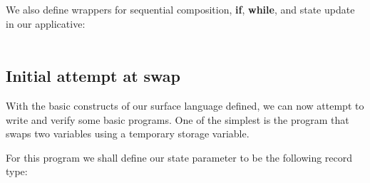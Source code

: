 \documentclass[sigplan]{acmart}%
\begin{document}
We also define wrappers for sequential composition, \textbf{if}, \textbf{while}, and state update in our  applicative:
\\[-0.5em]

\noindent {}\AgdaSpace{}%
\AgdaSpace{}%
\AgdaSpace{}%
\AgdaSymbol{=}\AgdaSpace{}%
\AgdaSpace{}%
\AgdaSpace{}%
\AgdaSpace{}%
\AgdaSpace{}%
\\[-0.5em]

\noindent {}\AgdaSpace{}%
\AgdaSpace{}%
\AgdaSpace{}%
\AgdaSpace{}%
\AgdaSpace{}%
\AgdaSpace{}%
\AgdaSpace{}%
\AgdaSymbol{=}\AgdaSpace{}%
\AgdaSpace{}%
\AgdaSymbol{(}\AgdaSpace{}%
\AgdaSymbol{)}\AgdaSpace{}%
\AgdaSpace{}%
\AgdaSpace{}%
%
\begin{code}
\>[2]\AgdaSpace{}%
\AgdaSpace{}%
\AgdaSpace{}%
\AgdaSpace{}%
\AgdaSpace{}%
\AgdaSymbol{=}\AgdaSpace{}%
\AgdaSpace{}%
\AgdaSymbol{(}\AgdaSpace{}%
\AgdaSymbol{)}\AgdaSpace{}%
\AgdaSpace{}%
\<%
\end{code}

\noindent {}\AgdaSpace{}%
\AgdaSpace{}%
\AgdaSymbol{=}\AgdaSpace{}%
\AgdaSpace{}%
\AgdaSymbol{(}\AgdaSpace{}%
\AgdaSymbol{)}

\subsection{Initial attempt at swap}

With the basic constructs of our surface language defined, we can now 
attempt to write and verify some basic programs. One of the simplest
is the program that swaps two variables using a temporary storage variable.

For this program we shall define our state parameter to be the following record type:
\end{document}
